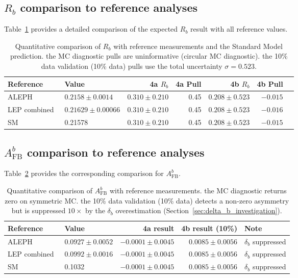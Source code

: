 \documentclass[11pt,a4paper]{article}
\begin{document}
\subsection{$R_b$ comparison to reference analyses}
\label{sec:rb_comparison_detail}

Table~\ref{tab:rb_comparison} provides a detailed comparison of the expected $R_b$
result with all reference values.

\begin{table}[htbp]
\centering
\caption{Quantitative comparison of $R_b$ with reference measurements
and the Standard Model prediction. the MC diagnostic pulls are uninformative (circular MC
diagnostic). the 10\% data validation (10\% data) pulls use the total uncertainty $\sigma = 0.523$.}
\label{tab:rb_comparison}
\begin{tabular}{llrrrrr}
\toprule
Reference & Value & 4a $R_b$ & 4a Pull & 4b $R_b$ & 4b Pull \\
\midrule
ALEPH~\cite{ALEPH:Rb:1996} & $0.2158 \pm 0.0014$ & $0.310 \pm 0.210$ & 0.45 & $0.208 \pm 0.523$ & $-0.015$ \\
LEP combined~\cite{LEP:EWWG:2005} & $0.21629 \pm 0.00066$ & $0.310 \pm 0.210$ & 0.45 & $0.208 \pm 0.523$ & $-0.016$ \\
SM~\cite{LEP:EWWG:2005} & 0.21578 & $0.310 \pm 0.210$ & 0.45 & $0.208 \pm 0.523$ & $-0.015$ \\
\bottomrule
\end{tabular}
\end{table}

\subsection{$A_\mathrm{FB}^b$ comparison to reference analyses}
\label{sec:afb_comparison_detail}

Table~\ref{tab:afb_comparison} provides the corresponding comparison for $A_\mathrm{FB}^b$.

\begin{table}[htbp]
\centering
\caption{Quantitative comparison of $A_\mathrm{FB}^b$ with reference measurements.
the MC diagnostic returns zero on symmetric MC. the 10\% data validation (10\% data) detects a non-zero
asymmetry but is suppressed $10\times$ by the $\delta_b$ overestimation
(Section~\ref{sec:delta_b_investigation}).}
\label{tab:afb_comparison}
\begin{tabular}{llrrl}
\toprule
Reference & Value & 4a result & 4b result (10\%) & Note \\
\midrule
ALEPH~\cite{ALEPH:AFBb} & $0.0927 \pm 0.0052$ & $-0.0001 \pm 0.0045$ & $0.0085 \pm 0.0056$ & $\delta_b$ suppressed \\
LEP combined~\cite{LEP:EWWG:2005} & $0.0992 \pm 0.0016$ & $-0.0001 \pm 0.0045$ & $0.0085 \pm 0.0056$ & $\delta_b$ suppressed \\
SM~\cite{LEP:EWWG:2005} & 0.1032 & $-0.0001 \pm 0.0045$ & $0.0085 \pm 0.0056$ & $\delta_b$ suppressed \\
\bottomrule
\end{tabular}
\end{table}
\end{document}
